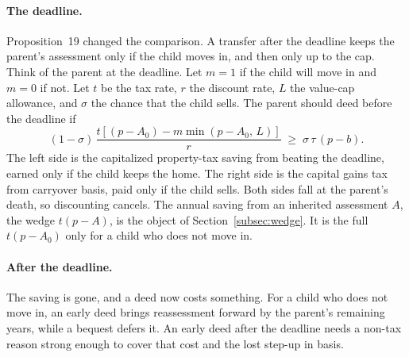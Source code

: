 \paragraph{The deadline.}
Proposition~19 changed the comparison. A transfer after the deadline keeps the parent's assessment only if the child moves in, and then only up to the cap. Think of the parent at the deadline. Let $m=1$ if the child will move in and $m=0$ if not. Let $t$ be the tax rate, $r$ the discount rate, $L$ the value-cap allowance, and $\sigma$ the chance that the child sells. The parent should deed before the deadline if
\begin{equation}
  (1-\sigma)\,\frac{t\left[(p-A_0)-m\min(p-A_0,\,L)\right]}{r}
  \;\geq\; \sigma\,\tau\,(p-b).
  \label{eq:deadline}
\end{equation}
The left side is the capitalized property-tax saving from beating the deadline, earned only if the child keeps the home. The right side is the capital gains tax from carryover basis, paid only if the child sells. Both sides fall at the parent's death, so discounting cancels. The annual saving from an inherited assessment $A$, the wedge $t(p-A)$, is the object of Section~\ref{subsec:wedge}. It is the full $t(p-A_0)$ only for a child who does not move in.

\paragraph{After the deadline.}
The saving is gone, and a deed now costs something. For a child who does not move in, an early deed brings reassessment forward by the parent's remaining years, while a bequest defers it. An early deed after the deadline needs a non-tax reason strong enough to cover that cost and the lost step-up in basis.


